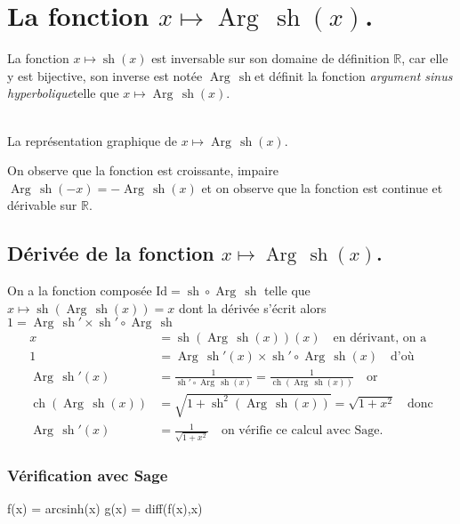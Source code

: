 \documentclass[a4paper,14pt]{extreport} %
\def\eclaire{\mathbb}
\def\R{\ensuremath{\eclaire R}}
\def\Id{\ensuremath{\mathrm{Id}}}
\renewcommand{\sinh}{\mathop{\mathrm{sh}}}
\renewcommand{\cosh}{\mathop{\mathrm{ch}}}
\renewcommand{\arg}{\mathop{\mathrm{Arg\,}}}
\begin{document}
\section{La fonction  $x \mapsto \arg\sinh(x)$.}

La fonction $x \mapsto \sinh(x)$ est inversable sur son domaine de définition $\R$, car elle y est bijective, son inverse est notée \og$ \arg\sinh $\fg et définit la fonction \og\emph{argument sinus hyperbolique}\fg telle que $x \mapsto \arg\sinh(x)$.


\begin{center}
 \\
La représentation graphique de $x \mapsto \arg\sinh(x)$.
\end{center}
On observe que la fonction est croissante, impaire $\arg\sinh(-x) = -\arg\sinh(x) $
et on observe que la fonction est continue et dérivable sur $\R$.                                                                                                             

\subsection{Dérivée de la fonction $x \mapsto \arg\sinh(x)$.}
On a la fonction composée $\Id = \sinh \circ \arg\sinh$ telle que $x\mapsto\sinh\left(\arg\sinh(x)\right)=x$ dont la dérivée s'écrit alors $1= \arg\sinh\nolimits' \times \sinh\nolimits'\circ\arg\sinh$
\begin{align*}
x & =\sinh\left(\arg\sinh(x)\right)(x) \quad \textrm{en dérivant, on a}\\
1 & = \arg\sinh\nolimits'(x) \times \sinh\nolimits'\circ\arg\sinh(x) \quad \textrm{d'où}\\
\arg\sinh\nolimits'(x) & =\frac{1}{ \sinh\nolimits'\circ\arg\sinh(x)}=\frac{1}{ \cosh\left(\arg\sinh(x)\right)}\quad \textrm{or}\\
\cosh\left(\arg\sinh(x)\right) & = \sqrt{1+\sinh\nolimits^2\left(\arg\sinh(x)\right)}=\sqrt{1+x^2}\quad \textrm{donc}\\
\arg\sinh\nolimits'(x) & = \frac{1}{ \sqrt{1+x^2}}\quad \textrm{on vérifie ce calcul avec Sage.}
\end{align*}


\subsubsection{Vérification avec Sage}


\begin{sageblock}
    f(x) = arcsinh(x)
    g(x) = diff(f(x),x)
\end{sageblock}
\end{document}
